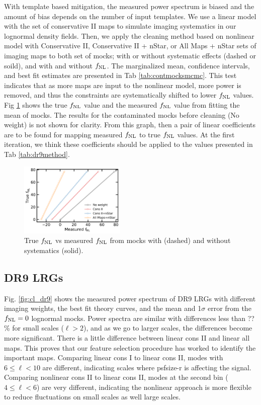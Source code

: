 With template based mitigation, the measured power spectrum is biased and the amount of bias depends on the number of input templates. We use a linear model with the set of conservative II maps to simulate imaging systematics in our lognormal density fields. Then, we apply the cleaning method based on nonlinear model with Conservative II, Conservative II + nStar, or All Maps + nStar sets of imaging maps to both set of mocks; with or without systematic effects (dashed or soild), and with and without $f_{\rm NL}$. The marginalized mean, confidence intervals, and best fit estimates are presented in Tab \ref{tab:contmocksmcmc}. This test indicates that as more maps are input to the nonlinear model, more power is removed, and thus the constraints are systematically shifted to lower $f_{\rm NL}$ values. Fig \ref{fig:fnlbias} shows the true $f_{\rm NL}$ value and the measured $f_{\rm NL}$ value from fitting the mean of mocks. The results for the contaminated mocks before cleaning (No weight) is not shown for clarity. From this graph, then a pair of linear coefficients are to be found for mapping measured $f_{\rm NL}$ to true $f_{\rm NL}$ values. At the first iteration, we think these coefficients should be applied to the values presented in Tab \ref{tab:dr9method}.


\begin{figure}
\centering
\includegraphics[width=0.45\textwidth]{figures/fnlbias}
\caption{True $f_{\rm NL}$ vs measured $f_{\rm NL}$ from mocks with (dashed) and without systematics (solid).}\label{fig:fnlbias}
\end{figure}

\subsection{DR9 LRGs}
Fig. \ref{fig:cl_dr9} shows the measured power spectrum of DR9 LRGs with different imaging weights, the best fit theory curves, and the mean and 1$\sigma$ error from the $f_{\rm NL}=0$ lognormal mocks. Power spectra are similar with differences less than ??\% for small scales ($\ell > 2$), and as we go to larger scales, the differences become more significant. There is a little difference between linear cons II and linear all maps. This proves that our feature selection procedure has worked to identify the important maps. Comparing linear cons I to linear cons II, modes with $6\leq \ell < 10$ are different, indicating scales where psfsize-r is affecting the signal. Comparing nonlinear cons II to linear cons II, modes at the second bin ($4 \leq \ell < 6$) are very different, indicating the nonlinear approach is more flexible to reduce fluctuations on small scales as well large scales. 

